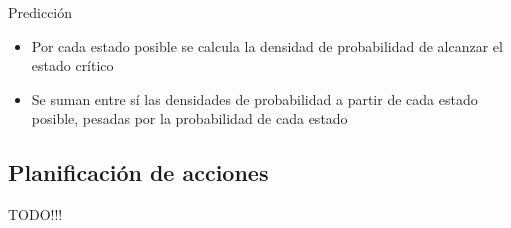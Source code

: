 \documentclass[9pt, handout]{beamer}
\begin{document}
      \begin{frame}{Predicción}
      	
      	\begin{itemize}
        	\item Por cada estado posible se calcula la densidad de probabilidad de alcanzar el estado crítico
        	\item Se suman entre sí las densidades de probabilidad a partir de cada estado posible, pesadas por la probabilidad de cada estado
      	\end{itemize}
      	\vspace{-1em}
      	
      \end{frame}
      
    \subsection{Planificación de acciones}
      \begin{frame}{TODO!!!}
      \end{frame}
\end{document}

